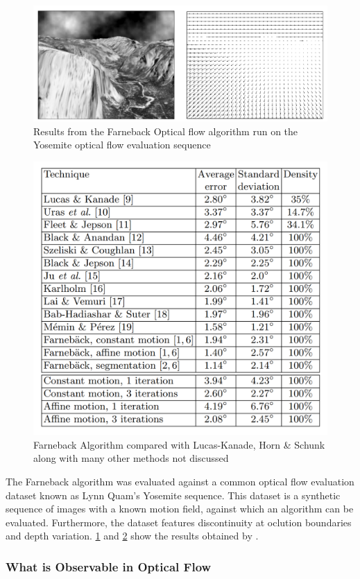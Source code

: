\documentclass{UoNMCHA}
\numberwithin{equation}{section}
\begin{document}
\begin{figure}[ht]\label{fig:farnebackYosemite}
    \begin{center}
        \includegraphics[width=.6\linewidth]{Figures/farnebackYosemite}
        \caption{Results from the Farneback Optical flow algorithm run on the Yosemite optical flow evaluation sequence\citep{farneback2003two}}
    \end{center}
\end{figure}

\begin{figure}[ht]\label{fig:farnebackResults}
    \begin{center}
        \includegraphics[width=.5\linewidth]{Figures/farnebackResults}
        \caption{Farneback Algorithm compared with Lucas-Kanade, Horn \& Schunk along with many other methods not discussed \citep{farneback2003two}}
    \end{center}
\end{figure}

The Farneback algorithm was evaluated against a common optical flow evaluation dataset known as Lynn Quam’s Yosemite sequence. This dataset is a synthetic sequence of images with a known motion field, against which an algorithm can be evaluated. Furthermore, the dataset features discontinuity at oclution boundaries and depth variation. \cref{fig:farnebackYosemite} and \cref{fig:farnebackResults} show the results obtained by \cite{farneback2003two}.
\subsubsection{What is Observable in Optical Flow}
\end{document}
